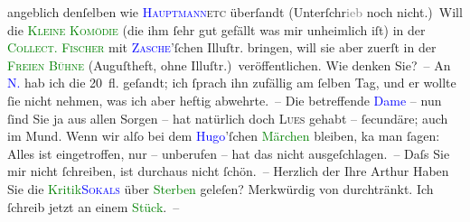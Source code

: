                angeblich denſelben wie \textcolor{blue}{\textsc{Hauptmann}}{}\ledrightnote{\textcolor{blue}{Gerhart Hauptmann}}{ }\textsc{etc} überſandt (Unterſchr\textcolor{gray}{ieb} noch
               nicht.) Will die \textcolor{green}{\textsc{Kleine Komödie}}{}\ledrightnote{\textcolor{green}{Die kleine Komödie}} (die ihm ſehr gut gefällt was mir unheimlich iſt) in der \textcolor{green}{\textsc{Collect. Fischer}}{}\ledrightnote{\textcolor{green}{Collection Fischer}} mit {\pb}\textsc{\textcolor{blue}{Zasche}{}\ledrightnote{\textcolor{blue}{Theodor Zasche}}}’ſchen Illuſtr. bringen, will sie aber zuerſt in der \textcolor{green}{\textsc{Freien Bühne}}{}\ledrightnote{\textcolor{green}{Neue Deutsche Rundschau}} (Auguſtheft, ohne Illuſtr.) veröffentlichen. Wie denken Sie? –\pend
           \pstart
           An \textcolor{blue}{N.}{}\ledrightnote{\textcolor{blue}{Gabor Nobl}} hab ich die 20 fl. geſandt; ich ſprach ihn
               zufällig am ſelben Tag, und er wollte ſie nicht nehmen, was ich aber {\pb}heftig abwehrte. – Die betreffende \textcolor{blue}{Dame}{} – nun ſind Sie ja aus allen Sorgen – hat
               natürlich doch \textsc{Lues} gehabt – ſecundäre; auch im Mund. Wenn
               wir alſo bei dem \textcolor{blue}{Hugo}{}\ledrightnote{\textcolor{blue}{Hugo von Hofmannsthal}}’ſchen \textcolor{green}{Märchen}{}\ledrightnote{\textcolor{green}{Das Märchen der 672. Nacht}} bleiben, ka{\geminationn} man ſagen:
               Alles ist eingetroffen, nur – unberufen – hat das \label{K_L00450_1v}\label{K_L00450_1h} nicht ausgeſchlagen. – Daſs Sie {\pb}mir nicht ſchreiben, ist durchaus nicht ſchön. –\pend
           \pstart Herzlich der Ihre \spacefill\mbox{Arthur}\pend{}\pstart
           Haben Sie die \textcolor{green}{Kritik}{}\textcolor{blue}{\textsc{Sokals}}{}\ledrightnote{\textcolor{blue}{Clemens Sokal}} über \textcolor{green}{Sterben}{}\ledrightnote{\textcolor{green}{Sterben. Novelle}} geleſen? Merkwürdig von \label{K_L00450_2v}\label{K_L00450_2h} durchtränkt.\pend
           \pstart
           Ich ſchreib jetzt an einem \textcolor{green}{Stück}{}. –\pend
           \endnumbering{}  
      